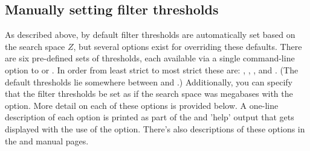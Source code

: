\subsection{Manually setting filter thresholds}

As described above, by default filter thresholds are automatically set
based on the search space $Z$, but several options exist for
overriding these defaults. There are six pre-defined sets of
thresholds, each available via a single command-line option to
 or . In order from least strict to most
strict these are: , , , and
. (The default thresholds lie somewhere between
 and .) Additionally, you can specify that
the filter thresholds be set as if the search space was 
megabases with the  option. More detail on each of
these options is provided below. A one-line description of each option
is printed as part of the  and  'help'
output that gets displayed with the use of the 
option. There's also descriptions of these options in the
 and  manual pages.

